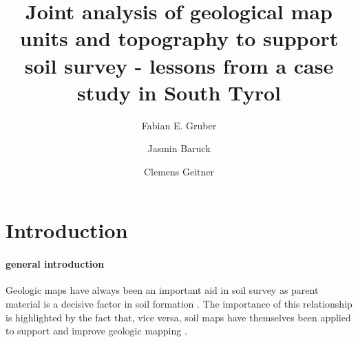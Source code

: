 \documentclass[preprint,12pt,authoryear]{elsarticle}
\begin{document}
\begin{frontmatter}

\title{Joint analysis of geological map units and topography to support soil survey - lessons from a case study in South Tyrol}



\author[mymainadress]{Fabian E. Gruber}
\author[mymainadress]{Jasmin Baruck}
\author[mymainadress]{Clemens Geitner}



\address[mymainadress]{Institute of Geography, University of Innsbruck, Innrain 52f, 6020 Innsbruck, Austria}

\begin{abstract}

\end{abstract}

\begin{keyword}

\end{keyword}

\end{frontmatter}

\linenumbers

\section{Introduction}
\paragraph{general introduction}
Geologic maps have always been an important aid in soil survey as parent material is a decisive factor in soil formation \citep{Jenny1941}. The importance of this relationship is highlighted by the fact that, vice versa, soil maps have themselves been applied to support and improve geologic mapping \citep{Brevik2015}. 
\end{document}
